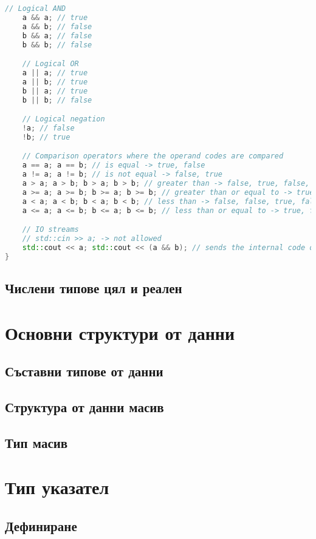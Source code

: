 \documentclass[fleqn,12pt]{article}
\begin{document}
\begin{flushleft}
\begin{lstlisting}[language=C++, caption=Bool operators]
    // Logical AND
    a && a; // true
    a && b; // false
    b && a; // false
    b && b; // false

    // Logical OR
    a || a; // true
    a || b; // true
    b || a; // true
    b || b; // false

    // Logical negation
    !a; // false
    !b; // true

    // Comparison operators where the operand codes are compared
    a == a; a == b; // is equal -> true, false
    a != a; a != b; // is not equal -> false, true
    a > a; a > b; b > a; b > b; // greater than -> false, true, false, false
    a >= a; a >= b; b >= a; b >= b; // greater than or equal to -> true, true, false, true
    a < a; a < b; b < a; b < b; // less than -> false, false, true, false
    a <= a; a <= b; b <= a; b <= b; // less than or equal to -> true, false, true, true

    // IO streams
    // std::cin >> a; -> not allowed
    std::cout << a; std::cout << (a && b); // sends the internal code of the boolean expression to the stdout fd -> 1, 0
}
\end{lstlisting}

\subsection{Числени типове цял и реален}

\section{Основни структури от данни}
\subsection{Съставни типове от данни}
\subsection{Структура от данни масив}
\subsection{Тип масив}

\section{Тип указател}
\subsection{Дефиниране}

\end{flushleft}
\end{document}
